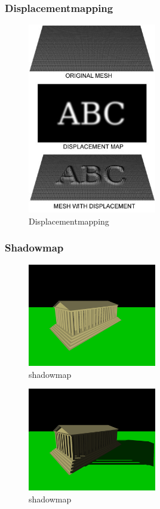 \subsubsection{Displacementmapping}
\begin{figure}[H]
    \centering
    \includegraphics[width=0.5\textwidth]{images/Displacement.jpg}
    \caption{Displacementmapping} %
    \label{fig:displacement-mapping}
\end{figure}



\subsubsection{Shadowmap}
\begin{figure}[H]
    \centering
    \includegraphics[width=0.5\textwidth]{images/sm_ns.png}
    \caption{shadowmap} %
    \label{fig:shadowmap1}
\end{figure}

\begin{figure}[H]
    \centering
    \includegraphics[width=0.5\textwidth]{images/sm_ws.png}
    \caption{shadowmap} %
    \label{fig:shadowmap2}
\end{figure}

